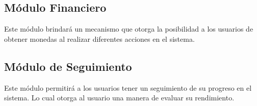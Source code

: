 \subsection*{Módulo Financiero}

 \noindent
 Este módulo brindará un mecanismo que otorga la posibilidad a los usuarios de
 obtener monedas al realizar diferentes acciones en el sistema.





\subsection*{Módulo de Seguimiento}

 \noindent
 Este módulo permitirá a los usuarios tener un seguimiento de su progreso en el sistema.
 Lo cual otorga al usuario una manera de evaluar su rendimiento.


%

